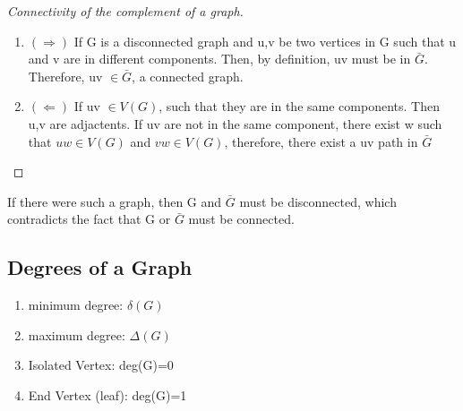 \documentclass{article}
\begin{document}
\begin{proof}[Connectivity of the complement of a graph]
    \begin{enumerate}
	    Let's work with the second proposition
	\item $(\Longrightarrow )$ If G is a disconnected graph and u,v be two
	    vertices in G such that u and v are in different components. Then,
	    by definition, uv must be in $\bar G$. Therefore, uv $\in \bar G$, a
	    connected graph.
	\item $(\Longleftarrow)$ If uv $\in V(G)$, such that they are in the same
	    components. Then u,v are adjactents. If uv are not in the same
	    component, there exist w such that $ uw \in V(G)$ and $vw \in V(G)$,
	    therefore, there exist a uv path in $\bar G$
    \end{enumerate}
\end{proof}

\begin{corollary}
    If there were such a graph, then G and $\bar G$ must be disconnected,
    which contradicts the fact that G or $\bar G$ must be connected.
\end{corollary}

\subsection{Degrees of a Graph}%
\label{sub:Degrees of a Graph}

\begin{definition}
    \begin{enumerate}
	\item minimum degree: $\delta(G)$
	\item maximum degree: $\Delta(G)$
	\item Isolated Vertex: deg(G)=0
	\item End Vertex (leaf): deg(G)=1
    \end{enumerate}
\end{definition}
\end{document}
